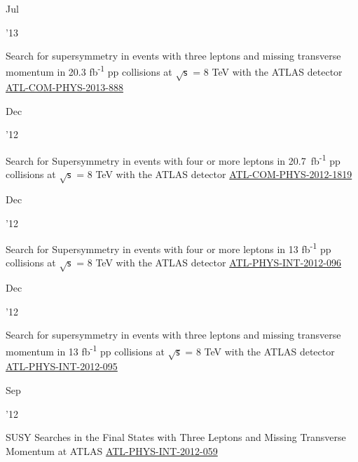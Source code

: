 \documentclass[]{cv} %
\begin{document}
\begin{entrylist}
\entry
{\parbox[t]{\parboxWidthOne}{Jul}\parbox[t]{\parboxWidthTwo}{\hfill '13}}
{Search for supersymmetry in events with three leptons and missing transverse momentum in 20.3 fb\textsuperscript{-1} pp
collisions at $\sqrt{\mathsf{s}}$ = 8 TeV with the ATLAS detector}
{\href{https://cds.cern.ch/record/1558985}{ATL-COM-PHYS-2013-888}}
{\vspace*{\spacingPubs}}

\entry
{\parbox[t]{\parboxWidthOne}{Dec}\parbox[t]{\parboxWidthTwo}{\hfill '12}}
{Search for Supersymmetry in events with four or more leptons in 20.7~fb\textsuperscript{-1} pp collisions at $\sqrt{\mathsf{s}}$
= 8 TeV with the ATLAS detector}
{\href{https://cds.cern.ch/record/1501709}{ATL-COM-PHYS-2012-1819}}
{\vspace*{\spacingPubs}}

\entry
{\parbox[t]{\parboxWidthOne}{Dec}\parbox[t]{\parboxWidthTwo}{\hfill '12}}
{Search for Supersymmetry in events with four or more leptons in 13 fb\textsuperscript{-1} pp collisions at $\sqrt{\mathsf{s}}$ =
8 TeV with the ATLAS detector}
{\href{https://cds.cern.ch/record/1498627}{ATL-PHYS-INT-2012-096}}
{\vspace*{\spacingPubs}}

\entry
{\parbox[t]{\parboxWidthOne}{Dec}\parbox[t]{\parboxWidthTwo}{\hfill '12}}
{Search for supersymmetry in events with three leptons and missing transverse momentum in 13 fb\textsuperscript{-1} pp collisions
at $\sqrt{\mathsf{s}}$ = 8 TeV with the ATLAS detector}
{\href{https://cds.cern.ch/record/1498390}{ATL-PHYS-INT-2012-095}}
{\vspace*{\spacingPubs}}

\entry
{\parbox[t]{\parboxWidthOne}{Sep}\parbox[t]{\parboxWidthTwo}{\hfill '12}}
{SUSY Searches in the Final States with Three Leptons and Missing Transverse Momentum at ATLAS}
{\href{https://cds.cern.ch/record/1482141}{ATL-PHYS-INT-2012-059}}
{\vspace*{\spacingPubs}}

\end{entrylist}
\fi
\end{document}
